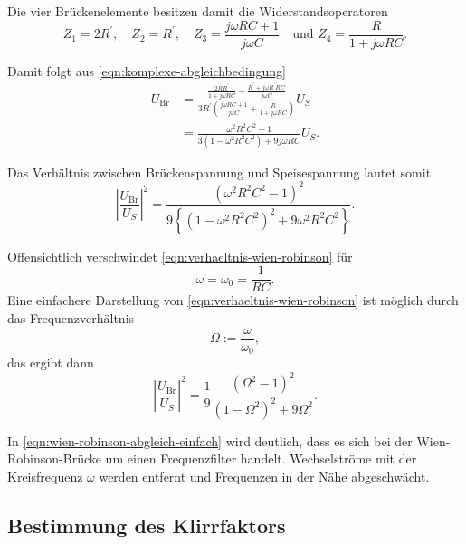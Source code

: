 Die vier Brückenelemente besitzen damit die Widerstandsoperatoren
\begin{equation}
	Z_1 = 2R^\prime,
	\quad
	Z_2 = R^\prime,
	\quad
	Z_3 = \frac{j\omega RC + 1}{j \omega C}
	\quad
	\text{und }
	Z_4 = \frac{R}{1 + j\omega RC}.
\end{equation}

Damit folgt aus \autoref{eqn:komplexe-abgleichbedingung}
\begin{align}
	U_\text{Br} 
	&= \frac{
		\frac{2 R R^\prime}{1 + j\omega RC}
		- \frac{R^\prime + j \omega R^\prime RC}{j\omega C}
	}
	{3 R^\prime \left(\frac{j \omega RC +1}{j\omega C}
			+ \frac{R}{1 + j \omega RC}
		\right)
	}
	U_S
	\\
	&= \frac{\omega^2 R^2 C^2 - 1}
	{3 \left(1 - \omega^2 R^2C^2\right) + 9 j\omega RC}
	U_S.
\end{align}

Das Verhältnis zwischen Brückenspannung und Speisespannung lautet somit
\begin{equation}
	\left|\frac{U_\text{Br}}{U_S}\right|^2
	=
	\frac{\left(\omega^2R^2C^2 - 1 \right)^2}
	{9 \left\{ \left(1 - \omega^2R^2C^2\right)^2 + 9\omega^2R^2C^2 \right\}}.
	\label{eqn:verhaeltnis-wien-robinson}
\end{equation}

Offensichtlich verschwindet \autoref{eqn:verhaeltnis-wien-robinson} für
\begin{equation}
	\omega = \omega_0 = \frac{1}{RC}.
	\label{eqn:wien-robinson-w0}
\end{equation}
Eine einfachere Darstellung von \autoref{eqn:verhaeltnis-wien-robinson} ist möglich durch
das Frequenzverhältnis
\begin{equation}
	\Omega := \frac{\omega}{\omega_0},
	\label{eqn:wien-robinson-frequenz}
\end{equation}
das ergibt dann
\begin{equation}
	\left|\frac{U_\text{Br}}{U_S}\right|^2
	=
	\frac{1}{9}
	\frac{\left(\Omega^2 - 1\right)^2}{\left(1 - \Omega^2\right)^2 + 9\Omega^2}.
	\label{eqn:wien-robinson-abgleich-einfach}
\end{equation}

In \autoref{eqn:wien-robinson-abgleich-einfach} wird deutlich, dass es sich bei der 
Wien-Robinson-Brücke um einen  Frequenzfilter handelt. Wechselströme mit der 
Kreisfrequenz $\omega$ werden entfernt und Frequenzen in der Nähe abgeschwächt.

\subsection{Bestimmung des Klirrfaktors}
\label{sec:klirrfaktor}


